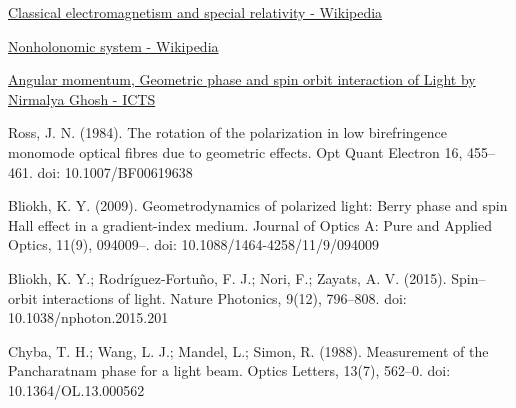 \documentclass[11pt,a4paper]{article}
\numberwithin{equation}{section}
\begin{document}
\begin{thebibliography}{999}
	  \href{https://en.wikipedia.org/wiki/Classical_electromagnetism_and_special_relativity}{Classical electromagnetism and special relativity - Wikipedia}
	  
	  
	  
	  \href{https://en.wikipedia.org/wiki/Nonholonomic_system}{Nonholonomic system - Wikipedia}
	  
	  \href{https://www.youtube.com/watch?v=e1ix-oBH5Ng&list=PL04QVxpjcnjjUn4IbvSncV24Uazej5fBI&index=2}{ Angular momentum, Geometric phase and spin orbit interaction of Light by Nirmalya Ghosh - ICTS}
	  
	  Ross, J. N. (1984). The rotation of the polarization in low birefringence monomode optical fibres due to geometric effects. Opt Quant Electron 16, 455–461. doi: 10.1007/BF00619638
	  
	   Bliokh, K. Y. (2009). Geometrodynamics of polarized light: Berry phase and spin Hall effect in a gradient-index medium. Journal of Optics A: Pure and Applied Optics, 11(9), 094009–. doi: 10.1088/1464-4258/11/9/094009
	   
	   Bliokh, K. Y.; Rodríguez-Fortuño, F. J.; Nori, F.; Zayats, A. V. (2015). Spin–orbit interactions of light. Nature Photonics, 9(12), 796–808. doi: 10.1038/nphoton.2015.201 
	  
	  Chyba, T. H.; Wang, L. J.; Mandel, L.; Simon, R. (1988). Measurement of the Pancharatnam phase for a light beam. Optics Letters, 13(7), 562–0. doi: 10.1364/OL.13.000562     
	   
\end{thebibliography}
\end{document}
